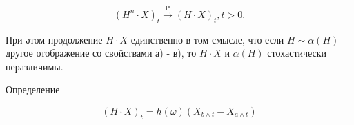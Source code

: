 \documentclass[10pt]{article}
\begin{document}
\[

\left(H^{n} \cdot X\right)_{t} \stackrel{\mathrm{P}}{\longrightarrow}(H \cdot X)_{t}, t>0 .

\]



При әтом продолжение $H \cdot X$ единственно в том смысле, что если $H \sim \alpha(H)-$ другое отображение со свойствами а) - в), то $H \cdot X$ и $\alpha(H)$ стохастически неразличимы.



Определение



\[

(H \cdot X)_{t}=h(\omega)\left(X_{b \wedge t}-X_{a \wedge t}\right)

\]
\end{document}
